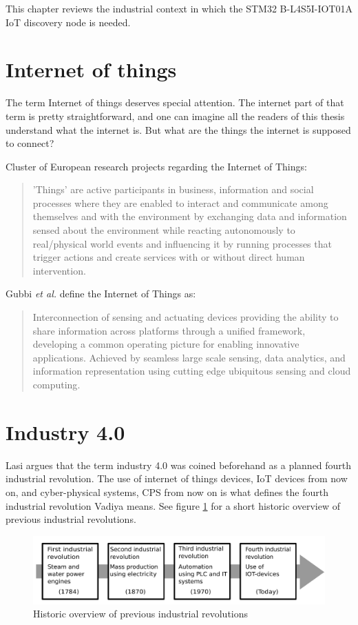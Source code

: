 This chapter reviews the industrial context in which the STM32 B-L4S5I-IOT01A IoT discovery node is needed.
\section{Internet of things}
The term Internet of things deserves special attention. 
The internet part of that term is pretty straightforward, and one can imagine all the readers of this thesis understand what the internet is.
But what are the things the internet is supposed to connect?

Cluster of European research projects regarding the Internet of Things:
\begin{quote}
    'Things' are active participants in business, information and social processes where they are enabled to interact and communicate among themselves and with the environment by exchanging data and information sensed about the environment while reacting autonomously to real/physical world events and influencing it by running processes that trigger actions and create services with or without direct human intervention\cite{Gubbi2013}.
\end{quote} 

Gubbi \textit{et al.} define the Internet of Things as:
\begin{quote}
    Interconnection of sensing and actuating devices providing the ability to share information across platforms through a unified framework, developing a common operating picture for enabling innovative applications. 
    Achieved by seamless large scale sensing, data analytics, and information representation using cutting edge ubiquitous sensing and cloud computing\cite{Gubbi2013}.
\end{quote}


\section{Industry 4.0}
Lasi argues that the term industry 4.0 was coined beforehand as a planned fourth industrial revolution\cite{Lasi2014}.
The use of internet of things devices, IoT devices from now on, and cyber-physical systems, CPS from now on is what defines the fourth industrial revolution Vadiya means\cite{Vaidya2018}.
See figure \ref{Indutrial revolutions} for a short historic overview of previous industrial revolutions.   
\begin{figure}
    \centering
    \includegraphics[width=\textwidth]{Pictures/Industrial_revolution.pdf} 
    \caption{Historic overview of previous industrial revolutions}
    \label{Indutrial revolutions}
\end{figure}

